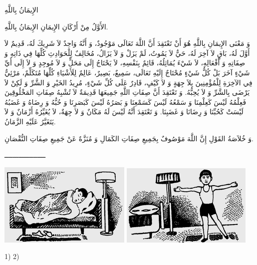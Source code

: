 \documentclass[a5paper]{article}
\begin{document}
الإِيمَانُ بِاللَّهِ

الأَوَّلُ مِنْ أَرْكَانِ الإِيمَانِ الإِيمَانُ بِاللَّهِ.

وَ مَعْنَى الإِيمَانِ بِاللَّهِ هُوَ أَنْ تَعْتَقِدَ أَنَّ اللَّهَ تَعَالَى مَوْجُودٌ، وَ أَنَّهُ وَاحِدٌ لاَ شَرِيكَ لَهُ، قَدِيمٌ لاَ أَوَّلَ لَهُ، بَاقٍ لاَ آخِرَ لَهُ، حَيٌّ لاَ يَمُوتُ، لَمْ يَزَلْ وَ لاَ يَزَالُ، مُخَالِفٌ لِلْحَوَادِثِ كُلِّهَا فِي ذَاتِهِ وَ صِفَاتِهِ وَ أَفْعَالِهِ، لاَ شَيْءَ يُمَاثِلُهُ، قَائِمٌ بِنَفْسِهِ، لاَ يَحْتَاجُ إِلَى مَحَلٍّ وَ لاَ مُوجِدٍ وَ لاَ إِلَى أَيِّ شَيْءٍ آخَرَ بَلْ كُلُّ شَيْءٍ مُحْتَاجٌ إِلَيْهِ تَعَالَى، سَمِيعٌ، بَصِيرٌ، عَالِمٌ لِلَأَشْيَاءِ كُلِّهَا مُتَكَلِّمٌ، مَرْئِيٌّ فِي الآخِرَةِ لِلْمُؤْمِنِينَ بِلاَ جِهَةٍ وَ لاَ كَيْفٍ، قَادِرٌ عَلَى كُلِّ شَيْءٍ، مُرِيدُ الخَيْرِ وَ الشَّرِّ وَ لَكِنْ لاَ يَرْضَى بِالشَّرِّ وَ لاَ يُحِبُّهُ. وَ تَعْتَقِدَ أَنَّ صِفَاتِ اللَّهِ جَمِيعَهَا قَدِيمَةٌ لاَ تُشْبِهُ صِفَاتِ المَخْلُوقِينَ فَعِلْمُهُ لَيْسَ كَعِلْمِنَا وَ سَمْعُهُ لَيْسَ كَسَمْعِنَا وَ بَصَرُهُ لَيْسَ كَبَصَرِنَا وَ حُبُّهُ وَ رِضَاهُ وَ غَضَبُهُ لَيْسَتْ كَحُبِّنَا وَ رِضَانَا وَ غَضَبِنَا. وَ تَعْتَقِدَ أَنَّهُ لَيْسَ لَهُ مَكَانٌ وَ لاَ جِهَةٌ، لاَ يُغَيِّرُهُ أَزْمَانٌ وَ لاَ يَتَغَيَّرُ عَلَيْهِ الزَّمَانُ.

وَ خُلاَصَةُ القَوْلِ إِنَّ اللَّهَ مَوْصُوفٌ بِجَمِيعِ صِفَاتِ الكَمَالِ وَ مُنَزَّهٌ عَنْ جَمِيعِ صِفَاتِ النُّقْصَانِ.

ــــــــــــــــــــ

 \includegraphics[width=2.5in,height=1.5728in]{images/MuhammadBagauddinprettified-img339.png}   \includegraphics[width=2.4791in,height=1.552in]{images/MuhammadBagauddinprettified-img340.png} 

1) 2)
\end{document}
